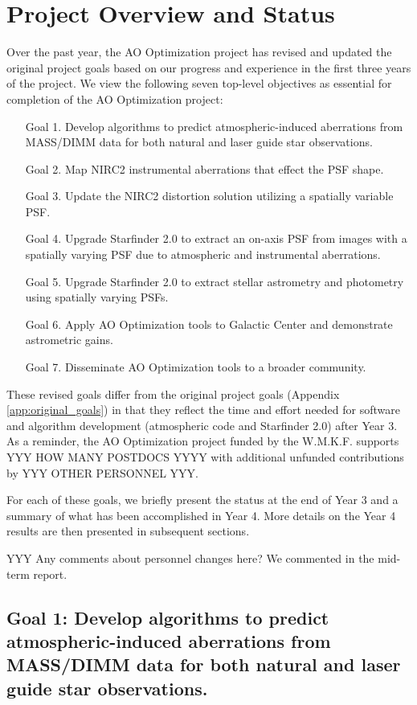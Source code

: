 \section{Project Overview and Status}
\label{sec:overview}

Over the past year, the AO Optimization project has revised and
updated the original project goals based on our progress and
experience in the first three years of the project. We view the
following seven top-level objectives as essential for completion of
the AO Optimization project:
\begin{enumerate}
\item[Goal 1.] Develop algorithms to predict atmospheric-induced aberrations
  from MASS/DIMM data for both natural and laser guide star observations.
\item[Goal 2.] Map NIRC2 instrumental aberrations that effect the PSF shape.
\item[Goal 3.] Update the NIRC2 distortion solution utilizing a spatially
  variable PSF.
\item[Goal 4.] Upgrade Starfinder 2.0 to extract an on-axis PSF from images with
  a spatially varying PSF due to atmospheric and instrumental aberrations.
\item[Goal 5.] Upgrade Starfinder 2.0 to extract stellar astrometry and
  photometry using spatially varying PSFs.
\item[Goal 6.] Apply AO Optimization tools to Galactic Center and demonstrate
  astrometric gains.
\item[Goal 7.] Disseminate AO Optimization tools to a broader community.
\end{enumerate}
These revised goals differ from the original project goals 
(Appendix \ref{app:original_goals}) in that
they reflect the time and effort needed for software and
algorithm development (atmospheric code and Starfinder 2.0) after Year
3. As a reminder, the AO Optimization project funded by the
W.M.K.F. supports YYY HOW MANY POSTDOCS YYYY with additional unfunded 
contributions by YYY OTHER PERSONNEL YYY. 

For each of these goals, we briefly present the status at the end of
Year 3 and a summary of what has been accomplished in Year 4. More
details on the Year 4 results are then presented in subsequent
sections.

YYY Any comments about personnel changes here? We commented in the
mid-term report.



\subsection{Goal 1: Develop algorithms to predict atmospheric-induced aberrations
  from MASS/DIMM data for both natural and laser guide star
  observations.}

